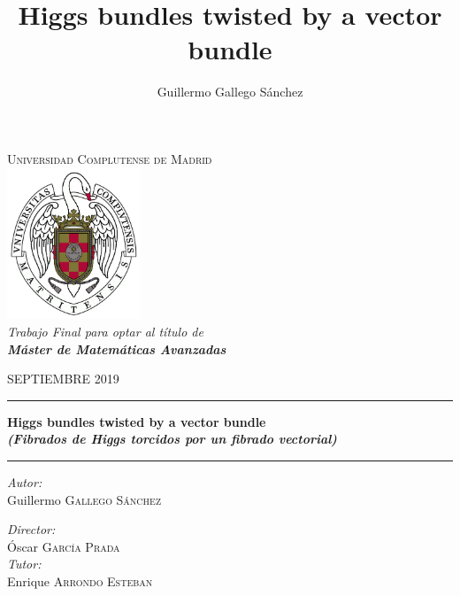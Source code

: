 \documentclass[12pt,a4paper]{book}
\title{Higgs bundles twisted by a vector bundle}
\author{Guillermo Gallego Sánchez}
\date{}
\theoremstyle{definition} \newtheorem{defn}[thm]{Definition}
\theoremstyle{definition} \newtheorem{ejemplo}[thm]{Example}
\theoremstyle{remark} \newtheorem{rem}[thm]{Remark}
\begin{document}

\newpage\thispagestyle{empty}
\begin{titlepage}
  \centering
  \LARGE \textsc{Universidad Complutense de Madrid} \\
  \vspace{1cm}
  \includegraphics[width=0.3\textwidth]{logoucm.png} \\
  \vspace{1cm}
  \LARGE \textit{Trabajo Final para optar al título de\\ \textbf{Máster de Matemáticas Avanzadas}} \\
  \vspace{1cm}

\rm \LARGE SEPTIEMBRE 2019

  \vspace{3cm}
  \hrule \vspace{0.5cm}
\Huge \bfseries \sffamily Higgs bundles twisted by a vector bundle \\
  \vspace{1cm}
\rm \Large \sffamily \it (Fibrados de Higgs torcidos por un fibrado vectorial) \\
   \vspace{0.5cm}\hrule

  \vfill

\begin{minipage}{0.5\textwidth}
  \rm \Large
  \textit{Autor:} \\
  Guillermo \textsc{Gallego Sánchez}
 \end{minipage}
 \hfill
\begin{minipage}{0.4\textwidth}
  \rm \large
  \textit{Director:}\\
Óscar \textsc{García Prada} \\
\textit{Tutor:} \\
Enrique \textsc{Arrondo Esteban}
  \end{minipage}
\end{titlepage}

\newpage\null\thispagestyle{empty}
\end{document}
